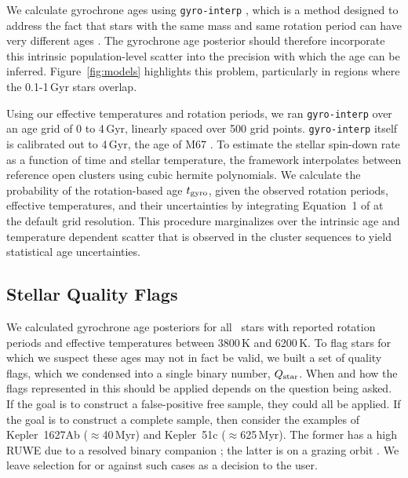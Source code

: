 \documentclass[11pt,twocolumn,tighten]{aastex63}
\begin{document}
We calculate gyrochrone ages using \texttt{gyro-interp}
\citep{Bouma_2023}, which is a method designed to address the fact
that stars
with the same mass and same rotation period can have very different
ages \citep[e.g.][]{Curtis_2019_ngc6811}.  The gyrochrone age
posterior should therefore incorporate this intrinsic population-level
scatter into the precision with which the age can be inferred.
Figure~\ref{fig:models} highlights this problem, particularly in
regions where the 0.1-1\,Gyr stars overlap.

Using our effective temperatures and rotation periods, we ran
\texttt{gyro-interp} over an age grid of 0 to 4\,Gyr, linearly spaced
over 500 grid points.  \texttt{gyro-interp} itself is calibrated out
to 4\,Gyr, the age of M67
\citep[see][]{2022ApJ...938..118D,Gruner_2023}.  To estimate the
stellar spin-down rate as a function of time and stellar temperature,
the framework interpolates between reference open clusters using
cubic hermite polynomials.  We calculate the probability of the
rotation-based age $t_{\rm gyro}$, given the observed rotation
periods, effective temperatures, and their uncertainties by
integrating Equation~1 of \citet{Bouma_2023} at the default grid
resolution.  This procedure marginalizes over the intrinsic age and
temperature dependent scatter that is observed in the cluster
sequences to yield statistical age uncertainties.


\subsection{Stellar Quality Flags}
\label{subsec:flags}
We calculated gyrochrone age posteriors for all
\nuniqstarsantosrotteffcut\ stars with reported rotation periods and
effective temperatures between 3800\,K and 6200\,K.  To flag stars for
which we suspect these ages may not in fact be valid, we built a set
of quality flags, which we condensed into a single binary number,
$Q_{\rm star}$.  When and how the flags represented in this should be
applied depends on the question being asked.  If the goal is to
construct a false-positive free sample, they could all be applied.  If
the goal is to construct a complete sample, then consider the examples
of Kepler~1627Ab ($\approx$40\,Myr) and Kepler~51c
($\approx$625\,Myr).  The former has a high RUWE due to a resolved
binary companion \citep{Bouma_2022a}; the latter is on a grazing orbit
\citep{2014ApJ...783...53M}.  We leave selection for or against such
cases as a decision to the user.
\end{document}
